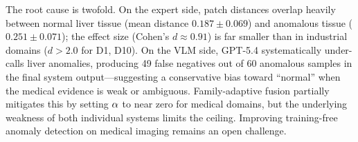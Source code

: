 The root cause is twofold.
On the expert side, patch distances overlap heavily between normal liver tissue (mean distance $0.187 \pm 0.069$) and anomalous tissue ($0.251 \pm 0.071$); the effect size (Cohen's $d \approx 0.91$) is far smaller than in industrial domains ($d > 2.0$ for D1, D10).
On the VLM side, GPT-5.4 systematically under-calls liver anomalies, producing 49 false negatives out of 60 anomalous samples in the final system output---suggesting a conservative bias toward ``normal'' when the medical evidence is weak or ambiguous.
Family-adaptive fusion partially mitigates this by setting $\alpha$ to near zero for medical domains, but the underlying weakness of both individual systems limits the ceiling.
Improving training-free anomaly detection on medical imaging remains an open challenge.

